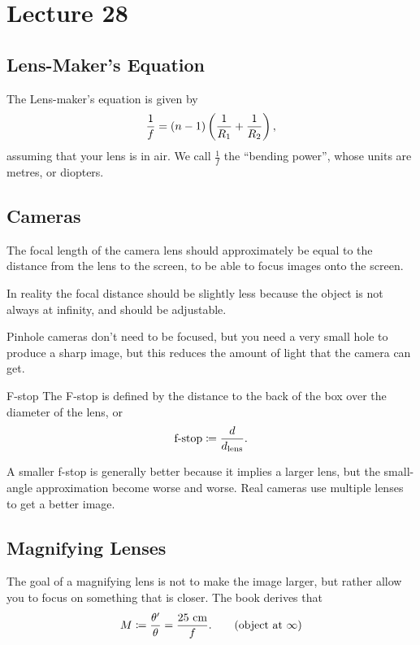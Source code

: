\documentclass[class=article, crop=false]{standalone}
\begin{document}
  \section{Lecture 28}
  \subsection{Lens-Maker's Equation}
  The Lens-maker's equation is given by
  \[
    \frac{1}{f} = (n-1) \left( \frac{1}{R_1} + \frac{1}{R_2} \right),
  \]
  assuming that your lens is in air. We call $\frac{1}{f}$ the ``bending power'', whose units are metres, or diopters.
  \subsection{Cameras}
  The focal length of the camera lens should approximately be equal to the distance from the lens to the screen, to be able to focus images onto the screen.
  \begin{note}{}
    In reality the focal distance should be slightly less because the object is not always at infinity, and should be adjustable.
  \end{note}
  Pinhole cameras don't need to be focused, but you need a very small hole to produce a sharp image, but this reduces the amount of light that the camera can get.
  \begin{definition}{F-stop}
    The F-stop is defined by the distance to the back of the box over the diameter of the lens, or
    \[
      \text{f-stop} \coloneqq \frac{d}{d_\text{lens}}.
    \]
  \end{definition}
  \begin{note}{}
    A smaller f-stop is generally better because it implies a larger lens, but the small-angle approximation become worse and worse. Real cameras use multiple lenses to get a better image.
  \end{note}
  \subsection{Magnifying Lenses}
  The goal of a magnifying lens is not to make the image larger, but rather allow you to focus on something that is closer. The book derives that
  \[
    M \coloneqq \frac{\theta'}{\theta} = \frac{25\ \mathrm{cm}}{f}. \tag{object at $\infty$}
  \]
\end{document}
